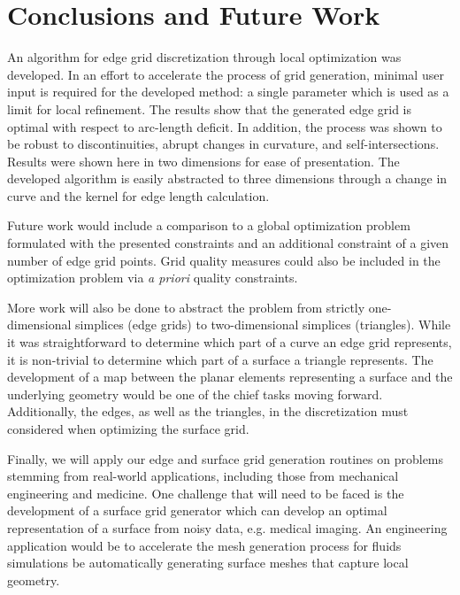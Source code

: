 \section{Conclusions and Future Work}
An algorithm for edge grid discretization through local optimization was 
developed. In an effort to accelerate the process of grid generation, 
minimal user input is required for the developed method: a single 
parameter which is used as a limit for local refinement. The results show 
that the generated edge grid is optimal with respect to arc-length 
deficit. In addition, the process was shown to be robust to 
discontinuities, abrupt changes in curvature, and self-intersections. 
Results were shown here in two dimensions for ease of presentation. The 
developed algorithm is easily abstracted to three dimensions through a 
change in curve and the kernel for edge length calculation.

Future work would include a comparison to a global optimization problem 
formulated with the presented constraints and an additional constraint of 
a given number of edge grid points. Grid quality measures could also be 
included in the optimization problem via {\it a priori} quality 
constraints.

More work will also be done to abstract the problem from strictly 
one-dimensional simplices (edge grids) to two-dimensional simplices 
(triangles). While it was straightforward to determine which part of a 
curve an edge grid represents, it is non-trivial to determine which part 
of a surface a triangle represents. The development of a map between the 
planar elements representing a surface and the underlying geometry would 
be one of the chief tasks moving forward. Additionally, the edges, as well 
as the triangles, in the discretization must considered when optimizing 
the surface grid.

Finally, we will apply our edge and surface grid generation routines on 
problems stemming from real-world applications, including those from 
mechanical engineering and medicine.  One challenge that will need to be 
faced is the development of a surface grid generator which can develop 
an optimal representation of a surface from noisy data, e.g. medical
imaging. An engineering application would be to accelerate the mesh generation
process for fluids simulations be automatically generating surface meshes
that capture local geometry.

